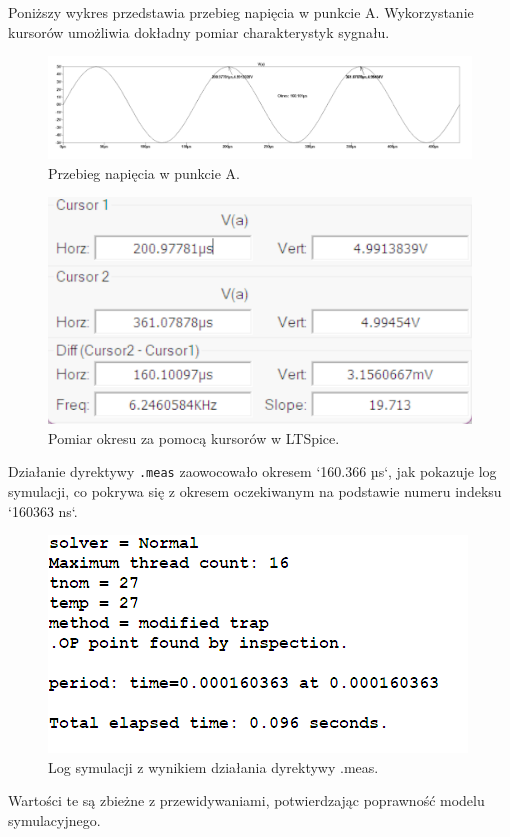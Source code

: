\documentclass[10pt]{article}
\begin{document}
	Poniższy wykres przedstawia przebieg napięcia w punkcie A. Wykorzystanie kursorów umożliwia dokładny pomiar charakterystyk sygnału.
	
	\begin{figure}[H]
		\centering
		\includegraphics[width=\linewidth]{2bwykres}
		\caption{Przebieg napięcia w punkcie A.}
		\label{fig:2bwykres}
	\end{figure}
	\pagebreak
	\begin{figure}[H]
		\centering
		\includegraphics[width=0.5\linewidth]{2bpomiary}
		\caption{Pomiar okresu za pomocą kursorów w LTSpice.}
		\label{fig:2bpomiary}
	\end{figure}
	
	Działanie dyrektywy \texttt{.meas} zaowocowało okresem `160.366 µs`, jak pokazuje log symulacji, co pokrywa się z okresem oczekiwanym na podstawie numeru indeksu `160363 ns`.
	
	\begin{figure}[H]
		\centering
		\includegraphics[width=0.6\linewidth]{2blog}
		\caption{Log symulacji z wynikiem działania dyrektywy .meas.}
		\label{fig:2blog}
	\end{figure}
	
	Wartości te są zbieżne z przewidywaniami, potwierdzając poprawność modelu symulacyjnego.
	
	
	
	\pagebreak
\end{document}
